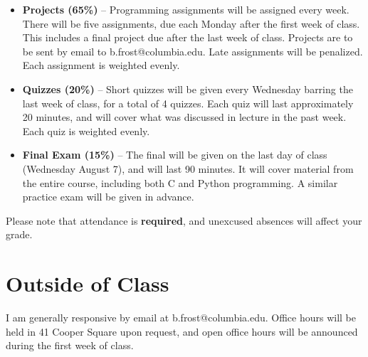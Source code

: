 \documentclass{article}
\begin{document}
\begin{itemize}

	\item \textbf{Projects (65\%)} -- Programming assignments will be assigned every week. There will be five assignments, due each Monday after the first week of class. This includes a final project due after the last week of class. Projects are to be sent by email to b.frost@columbia.edu. Late assignments will be penalized. Each assignment is weighted evenly.
	\item \textbf{Quizzes (20\%)} -- Short quizzes will be given every Wednesday barring the last week of class, for a total of 4 quizzes. Each quiz will last approximately 20 minutes, and will cover what was discussed in lecture in the past week. Each quiz is weighted evenly.
	\item \textbf{Final Exam (15\%)} -- The final will be given on the last day of class (Wednesday August 7), and will last 90 minutes. It will cover material from the entire course, including both C and Python programming. A similar practice exam will be given in advance.

\end{itemize}

Please note that attendance is \textbf{required}, and unexcused absences will affect your grade.

\section*{Outside of Class}

I am generally responsive by email at b.frost@columbia.edu. Office hours will be held in 41 Cooper Square upon request, and open office hours will be announced during the first week of class.
\end{document}
